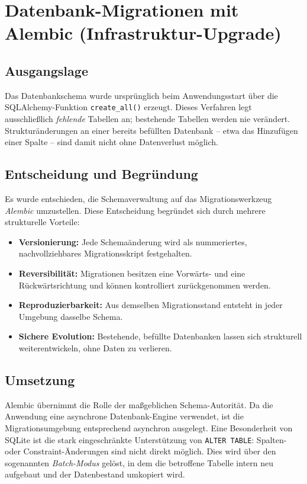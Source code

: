 \documentclass[11pt,a4paper]{article}
\begin{document}
\section{Datenbank-Migrationen mit Alembic (Infrastruktur-Upgrade)}

\subsection{Ausgangslage}

Das Datenbankschema wurde ursprünglich beim Anwendungsstart über die
SQLAlchemy-Funktion \texttt{create\_all()} erzeugt. Dieses Verfahren legt
ausschließlich \emph{fehlende} Tabellen an; bestehende Tabellen werden nie verändert.
Strukturänderungen an einer bereits befüllten Datenbank -- etwa das Hinzufügen einer
Spalte -- sind damit nicht ohne Datenverlust möglich.

\subsection{Entscheidung und Begründung}

Es wurde entschieden, die Schemaverwaltung auf das Migrationswerkzeug \emph{Alembic}
umzustellen. Diese Entscheidung begründet sich durch mehrere strukturelle Vorteile:

\begin{itemize}
  \item \textbf{Versionierung:} Jede Schemaänderung wird als nummeriertes,
        nachvollziehbares Migrationsskript festgehalten.
  \item \textbf{Reversibilität:} Migrationen besitzen eine Vorwärts- und eine
        Rückwärtsrichtung und können kontrolliert zurückgenommen werden.
  \item \textbf{Reproduzierbarkeit:} Aus demselben Migrationsstand entsteht in jeder
        Umgebung dasselbe Schema.
  \item \textbf{Sichere Evolution:} Bestehende, befüllte Datenbanken lassen sich
        strukturell weiterentwickeln, ohne Daten zu verlieren.
\end{itemize}

\subsection{Umsetzung}

Alembic übernimmt die Rolle der maßgeblichen Schema-Autorität. Da die Anwendung eine
asynchrone Datenbank-Engine verwendet, ist die Migrationsumgebung entsprechend
asynchron ausgelegt. Eine Besonderheit von SQLite ist die stark eingeschränkte
Unterstützung von \texttt{ALTER TABLE}: Spalten- oder Constraint-Änderungen sind nicht
direkt möglich. Dies wird über den sogenannten \emph{Batch-Modus} gelöst, in dem die
betroffene Tabelle intern neu aufgebaut und der Datenbestand umkopiert wird.
\end{document}
